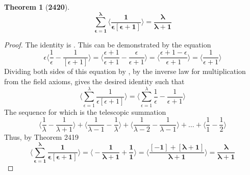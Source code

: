 \documentclass[preview]{standalone}
\newtheorem*{theorem*}{Theorem}
\begin{document}
\begin{theorem*}[\textbf{2420}]
    \begin{equation*}
        \bm{
            \sum_{\epsilon=1}^\lambda 
                    \bigg \langle 
                        \frac{1}{\epsilon [ \epsilon + 1 ]}
                    \bigg \rangle
                = 
            \frac{\lambda}{\lambda + 1}
        }
    \end{equation*}
\end{theorem*}

\begin{proof}
    The identity  is 
    . 
    This can be demonstrated by the equation
    \begin{equation*}
        \epsilon \bigg \langle \frac{1}{\epsilon} - \frac{1}{ [ \epsilon + 1 ] } \bigg \rangle 
            = 
        \bigg \langle \frac{\epsilon + 1}{\epsilon + 1} - \frac{\epsilon}{\epsilon + 1} \bigg \rangle
            = 
        \bigg \langle \frac{\epsilon + 1 - \epsilon}{\epsilon + 1} \bigg \rangle
            = 
        \bigg \langle \frac{1}{\epsilon + 1} \bigg \rangle
    \end{equation*}
    Dividing both sides of this equation by \bm{$\epsilon$},
    by the inverse law for multiplication from the field axioms,
    gives the desired identity such that
    \begin{equation*}
        \bigg \langle 
        \sum_{\epsilon=1}^\lambda 
                    \frac{1}{\epsilon [ \epsilon + 1 ]}
                \bigg \rangle 
            = 
        \bigg \langle 
        \sum_{\epsilon=1}^\lambda 
                    \frac{1}{\epsilon} - \frac{1}{\epsilon + 1} 
                \bigg \rangle
    \end{equation*}
    The sequence for which is the telescopic summation
    \begin{equation*}
        \bigg \langle \frac{1}{\lambda} - \frac{1}{\lambda + 1} \bigg \rangle
            + 
        \bigg \langle \frac{1}{\lambda - 1} - \frac{1}{\lambda} \bigg \rangle 
            + 
        \bigg \langle \frac{1}{\lambda - 2} - \frac{1}{\lambda - 1} \bigg \rangle
            + 
        \dots 
            + 
        \bigg \langle \frac{1}{1} - \frac{1}{2} \bigg \rangle
    \end{equation*}
    Thus, by Theorem 2419
    \begin{equation*}
        \bm{
            \bigg \langle
            \sum_{\epsilon=1}^\lambda
                        \frac{1}{ \epsilon [ \epsilon + 1 ] } 
                    \bigg \rangle
                = 
            \bigg \langle -\frac{1}{\lambda + 1} + \frac{1}{1} \bigg \rangle 
                = 
            \bigg \langle \frac{ [ -1 ] + [ \lambda + 1 ] }{\lambda + 1} \bigg \rangle 
                = 
            \frac{\lambda}{\lambda+1}
        }
    \end{equation*}
\color{lightgray} \end{proof}
\end{document}
